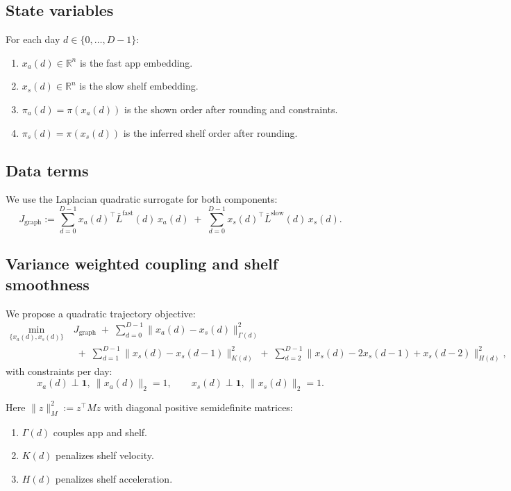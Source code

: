 \documentclass[11pt]{article}
\begin{document}
\subsection{State variables}
For each day $d\in\{0,\dots,D-1\}$:
\begin{enumerate}
\item $x_a(d)\in\mathbb{R}^n$ is the fast app embedding.
\item $x_s(d)\in\mathbb{R}^n$ is the slow shelf embedding.
\item $\pi_a(d)=\pi(x_a(d))$ is the shown order after rounding and constraints.
\item $\pi_s(d)=\pi(x_s(d))$ is the inferred shelf order after rounding.
\end{enumerate}

\subsection{Data terms}
We use the Laplacian quadratic surrogate for both components:
\begin{equation}
J_{\text{graph}} :=
\sum_{d=0}^{D-1} x_a(d)^\top \overline{L}^{\text{fast}}(d)\,x_a(d)
\;+\;
\sum_{d=0}^{D-1} x_s(d)^\top \overline{L}^{\text{slow}}(d)\,x_s(d).
\label{eq:data_terms_hplfree}
\end{equation}

\subsection{Variance weighted coupling and shelf smoothness}
We propose a quadratic trajectory objective:
\begin{align}
\min_{\{x_a(d),x_s(d)\}}
\ &J_{\text{graph}}
\;+\;
\sum_{d=0}^{D-1} \|x_a(d)-x_s(d)\|_{\Gamma(d)}^2
\label{eq:coupling_hplfree}
\\
&\;+\;
\sum_{d=1}^{D-1} \|x_s(d)-x_s(d-1)\|_{K(d)}^2
\;+\;
\sum_{d=2}^{D-1} \|x_s(d)-2x_s(d-1)+x_s(d-2)\|_{H(d)}^2,
\label{eq:temporal_smooth_hplfree}
\end{align}
with constraints per day:
\[
x_a(d)\perp\mathbf{1},\ \|x_a(d)\|_2=1,
\qquad
x_s(d)\perp\mathbf{1},\ \|x_s(d)\|_2=1.
\]

Here $\|z\|_{M}^2 := z^\top M z$ with diagonal positive semidefinite matrices:
\begin{enumerate}
\item $\Gamma(d)$ couples app and shelf.
\item $K(d)$ penalizes shelf velocity.
\item $H(d)$ penalizes shelf acceleration.
\end{enumerate}
\end{document}
